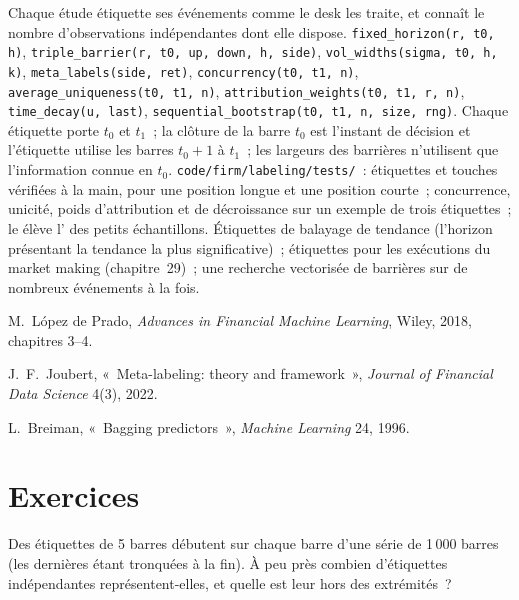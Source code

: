 \begin{build}
 Chaque étude étiquette ses événements comme le desk les traite, et connaît le nombre
d'observations indépendantes dont elle dispose.
 \texttt{fixed\_horizon(r, t0, h)}, \texttt{triple\_barrier(r, t0, up, down, h, side)},
\texttt{vol\_widths(sigma, t0, h, k)}, \texttt{meta\_labels(side, ret)}, \texttt{concurrency(t0, t1, n)},
\texttt{average\_uniqueness(t0, t1, n)}, \texttt{attribution\_weights(t0, t1, r, n)}, \texttt{time\_decay(u, last)},
\texttt{sequential\_bootstrap(t0, t1, n, size, rng)}.
 Chaque étiquette porte $t_0$ et $t_1$~; la clôture de la barre $t_0$ est l'instant de décision et l'étiquette utilise les barres
$t_0 + 1$ à $t_1$~; les largeurs des barrières n'utilisent que l'information connue en $t_0$.
 \texttt{code/firm/labeling/tests/}~: étiquettes et touches vérifiées à la main, pour une position longue et une position courte~;
concurrence, unicité, poids d'attribution et de décroissance sur un exemple de trois étiquettes~; le  élève
l' des petits échantillons.
 Étiquettes de balayage de tendance (l'horizon présentant la tendance la plus significative)~; étiquettes pour les exécutions du market making
(chapitre~29)~; une recherche vectorisée de barrières sur de nombreux événements à la fois.
\end{build}

\begin{omsources}
\item M.~López de Prado, \emph{Advances in Financial Machine Learning}, Wiley, 2018, chapitres 3--4.
\item J.~F.~Joubert, «~Meta-labeling: theory and framework~», \emph{Journal of Financial Data Science} 4(3), 2022.
\item L.~Breiman, «~Bagging predictors~», \emph{Machine Learning} 24, 1996.
\end{omsources}

\section{Exercices}

\begin{exercise}[$\star$]\label{exo:ml:targets-labels-and-sample-weights:1}
Des étiquettes de 5 barres débutent sur chaque barre d'une série de 1\,000 barres (les dernières étant tronquées à la fin). À peu près combien
d'étiquettes indépendantes représentent-elles, et quelle est leur  hors des extrémités~?
\end{exercise}


